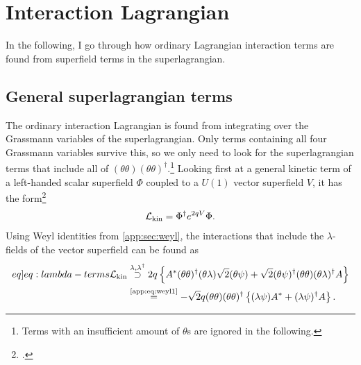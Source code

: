 \documentclass[english, notitlepage]{article}
\begin{document}
\section{Interaction Lagrangian}
    In the following, I go through how ordinary Lagrangian interaction terms are found from superfield terms in the superlagrangian.
    \subsection{General superlagrangian terms}
        The ordinary interaction Lagrangian is found from integrating over the
        Grassmann variables of the superlagrangian.
        Only terms containing all four Grassmann variables survive this, so we only need to look for the superlagrangian terms that include all of $(\theta\theta)(\theta\theta)^\dagger$.\footnote{Terms with an insufficient amount of $\theta$s are ignored in the following.}
        Looking first at a general kinetic term of a left-handed scalar superfield \(\Phi\) coupled to a $U(1)$ vector superfield \(V\), it has the form\footcite{Binetruy:2006ad}
        \begin{align}
            {\mathcal{L}}_\text{kin} = \Phi^\dag e^{2qV} \Phi.
        \end{align}
        Using Weyl identities from \cref{app:sec:weyl}, the interactions that include the $\lambda$-fields of the vector superfield can be found as
        \begin{align}
            \label[eq]{eq:lambda-terms}
            \nonumber
            \msub{\L}{kin} & \stackrel{\lambda, \lambda^\dagger}{\supset} 2q\cclosed{ A^\ast (\theta\theta)^\dagger(\theta\lambda) \sqrt{2} (\theta\psi) + \sqrt{2} (\theta\psi)^\dagger (\theta\theta)(\theta\lambda)^\dagger A } \\
                           & \stackrel{\text{\cref{app:eq:weyl1}}}{=} -\sqrt{2}q (\theta\theta)(\theta\theta)^\dagger \cclosed{ (\lambda\psi)A^\ast + (\lambda\psi)^\dagger A }.
        \end{align}
\end{document}
